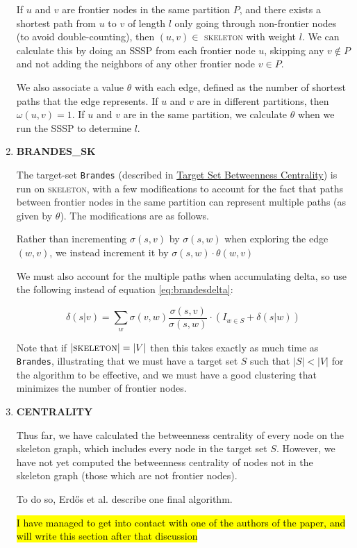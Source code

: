 \documentclass[a4paper,12pt]{article}
\begin{document}
\begin{enumerate}[label = \textbf{\arabic*.}]
If $u$ and $v$ are frontier nodes in the same partition $P$, and there exists a shortest path from $u$ to $v$ of length $l$ only going through non-frontier nodes (to avoid double-counting), then $(u,v) \in$ \textsc{skeleton} with weight $l$. We can calculate this by doing an SSSP from each frontier node $u$, skipping any $v \not \in P$ and not adding the neighbors of any other frontier node $v \in P$.

We also associate a value $\theta$ with each edge, defined as the number of shortest paths that the edge represents. If $u$ and $v$ are in different partitions, then $\omega(u,v) = 1$. If $u$ and $v$ are in the same partition, we calculate $\theta$ when we run the SSSP to determine $l$.


\item \textbf{BRANDES\_SK}

The target-set \texttt{Brandes} (described in \hyperref[sec:targetset]{Target Set Betweenness Centrality}) is run on \textsc{skeleton}, with a few modifications to account for the fact that paths between frontier nodes in the same partition can represent multiple paths (as given by $\theta$). The modifications are as follows.

Rather than incrementing $\sigma(s,v)$ by $\sigma(s,w)$ when exploring the edge $(w,v)$, we instead increment it by $\sigma(s,w)\cdot \theta(w,v)$


We must also account for the multiple paths when accumulating delta, so use the following instead of equation \ref{eq:brandesdelta}:

\begin{equation}
\delta(s|v) = \sum_{w} \sigma(v,w)\frac{\sigma(s,v)}{\sigma(s,w)}\cdot (I_{w\in S}+\delta(s|w))
\end{equation}

Note that if $|\textsc{skeleton}| = |V|$ then this takes exactly as much time as \texttt{Brandes}, illustrating that we must have a target set $S$ such that $|S| < |V|$ for the algorithm to be effective, and we must have a good clustering that minimizes the number of frontier nodes.

\item \textbf{CENTRALITY}

Thus far, we have calculated the betweenness centrality of every node on the skeleton graph, which includes every node in the target set $S$. However, we have not yet computed the betweenness centrality of nodes not in the skeleton graph (those which are not frontier nodes).

To do so, Erd\H{o}s et al. describe one final algorithm. 

\hl{I have managed to get into contact with one of the authors of the paper, and will write this section after that discussion}
\end{enumerate}
\end{document}
